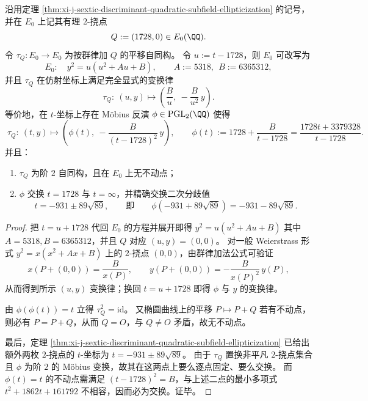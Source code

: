 \begin{theorem}\label{thm:xi-j-discriminant-elliptic-2torsion-mobius}
沿用定理 \ref{thm:xi-j-sextic-discriminant-quadratic-subfield-ellipticization} 的记号，并在 \(E_0\) 上记其有理 \(2\)-挠点
\[
Q:=(1728,0)\in E_0(\QQ).
\]
令 \(\tau_Q:E_0\to E_0\) 为按群律加 \(Q\) 的平移自同构。
令 \(u:=t-1728\)，则 \(E_0\) 可改写为
\[
E_0:\quad y^2=u(u^2+Au+B),
\qquad
A:=5318,\ \ B:=6365312,
\]
并且 \(\tau_Q\) 在仿射坐标上满足完全显式的变换律
\[
\boxed{\;
\tau_Q:\ (u,y)\longmapsto \left(\frac{B}{u},\ -\frac{B}{u^2}\,y\right). \;}
\]
等价地，在 \(t\)-坐标上存在 Möbius 反演 \(\phi\in\mathrm{PGL}_2(\QQ)\) 使得
\[
\boxed{\;
\tau_Q:\ (t,y)\longmapsto\left(\phi(t),\ -\frac{B}{(t-1728)^2}\,y\right),\qquad
\phi(t):=1728+\frac{B}{t-1728}=\frac{1728t+3379328}{t-1728}. \;}
\]
并且：
\begin{enumerate}
  \item \(\tau_Q\) 为阶 \(2\) 自同构，且在 \(E_0\) 上无不动点；
  \item \(\phi\) 交换 \(t=1728\) 与 \(t=\infty\)，并精确交换二次分歧值
  \[
  t=-931\pm 89\sqrt{89},
  \qquad\text{即}\qquad
  \phi(-931+89\sqrt{89})=-931-89\sqrt{89}.
  \]
\end{enumerate}
\end{theorem}
\begin{proof}
把 \(t=u+1728\) 代回 \(E_0\) 的方程并展开即得
\(
y^2=u(u^2+Au+B)
\)
其中 \(A=5318,B=6365312\)，并且 \(Q\) 对应 \((u,y)=(0,0)\)。
对一般 Weierstrass 形式 \(y^2=x(x^2+Ax+B)\) 上的 \(2\)-挠点 \((0,0)\)，由群律加法公式可验证
\[
x(P+(0,0))=\frac{B}{x(P)},\qquad
y(P+(0,0))=-\frac{B}{x(P)^2}\,y(P),
\]
从而得到所示 \((u,y)\) 变换律；换回 \(t=u+1728\) 即得 \(\phi\) 与 \(y\) 的变换律。
\par
由 \(\phi(\phi(t))=t\) 立得 \(\tau_Q^2=\mathrm{id}\)。
又椭圆曲线上的平移 \(P\mapsto P+Q\) 若有不动点，则必有 \(P=P+Q\)，从而 \(Q=O\)，与 \(Q\neq O\) 矛盾，故无不动点。
\par
最后，定理 \ref{thm:xi-j-sextic-discriminant-quadratic-subfield-ellipticization} 已给出额外两枚 \(2\)-挠点的 \(t\)-坐标为 \(t=-931\pm 89\sqrt{89}\)。
由于 \(\tau_Q\) 置换非平凡 \(2\)-挠点集合且 \(\phi\) 为阶 \(2\) 的 Möbius 变换，故其在这两点上要么逐点固定、要么交换。
而 \(\phi(t)=t\) 的不动点需满足 \((t-1728)^2=B\)，与上述二点的最小多项式 \(t^2+1862t+161792\) 不相容，因而必为交换。证毕。
\end{proof}

